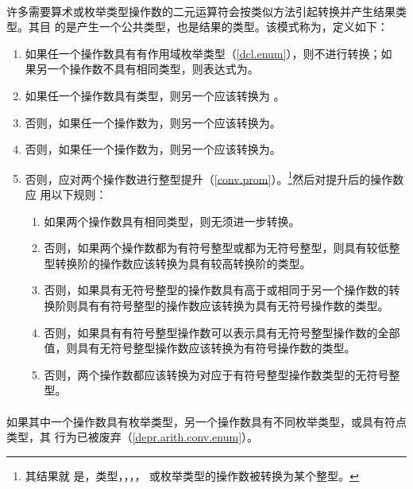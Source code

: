 \paragraph{} %
许多需要算术或枚举类型操作数的二元运算符会按类似方法引起转换并产生结果类型。其目
的是产生一个公共类型，也是结果的类型。该模式称为，定义如下：
\begin{enumerate}
  \item 如果任一个操作数具有有作用域枚举类型（\ref{dcl.enum}），则不进行转换；如
        果另一个操作数不具有相同类型，则表达式为\illform{}。
  \item 如果任一个操作数具有类型，则另一个应该转换为
        。
  \item 否则，如果任一个操作数为，则另一个应该转换为。
  \item 否则，如果任一个操作数为，则另一个应该转换为。
  \item 否则，应对两个操作数进行整型提升（\ref{conv.prom}）。\footnote{其结果就
        是，类型，，，，
        或枚举类型的操作数被转换为某个整型。}然后对提升后的操作数应
        用以下规则：
        \begin{enumerate}
          \item 如果两个操作数具有相同类型，则无须进一步转换。
          \item 否则，如果两个操作数都为有符号整型或都为无符号整型，则具有较低整
                型转换阶的操作数应该转换为具有较高转换阶的类型。
          \item 否则，如果具有无符号整型的操作数具有高于或相同于另一个操作数的转
                换阶则具有有符号整型的操作数应该转换为具有无符号操作数的类型。
          \item 否则，如果具有有符号整型操作数可以表示具有无符号整型操作数的全部
                值，则具有无符号整型操作数应该转换为有符号操作数的类型。
          \item 否则，两个操作数都应该转换为对应于有符号整型操作数类型的无符号整
                型。
        \end{enumerate}
\end{enumerate}

\paragraph{} %
如果其中一个操作数具有枚举类型，另一个操作数具有不同枚举类型，或具有符点类型，其
行为已被废弃（\ref{depr.arith.conv.enum}）。

